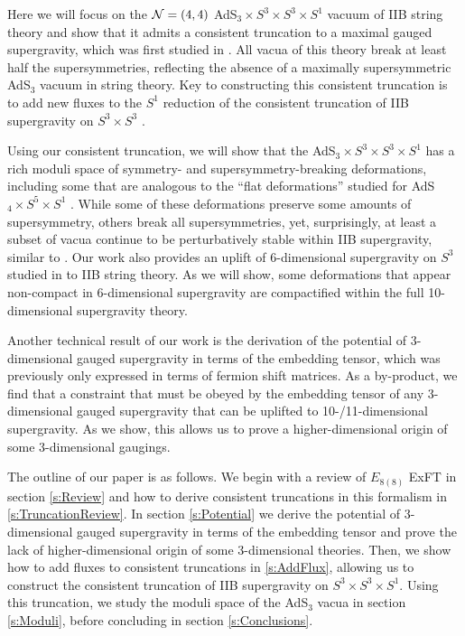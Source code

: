 \documentclass[a4paper, 11pt]{article}
\numberwithin{equation}{section}
\newcommand{\EE}{\ensuremath{E_{8(8)}}\xspace}
\newcommand{\+}{\oplus}
\begin{document}
Here we will focus on the ${\cal N}=(4,4)$ AdS$_3 \times S^3 \times S^3 \times S^1$ vacuum of IIB string theory and show that it admits a consistent truncation to a maximal gauged supergravity, which was first studied in \cite{Hohm:2005ui}. All vacua of this theory break at least half the supersymmetries, reflecting the absence of a maximally supersymmetric AdS$_3$ vacuum in string theory. Key to constructing this consistent truncation is to add new fluxes to the $S^1$ reduction of the consistent truncation of IIB supergravity on $S^3 \times S^3$ \cite{Inverso:2016eet}.

Using our consistent truncation, we will show that the AdS$_3 \times S^3 \times S^3 \times S^1$ has a rich moduli space of symmetry- and supersymmetry-breaking deformations, including some that are analogous to the ``flat deformations'' studied for AdS$_4 \times S^5 \times S^1$ \cite{Guarino:2020gfe,Guarino:2021hrc,Giambrone:2021zvp,Giambrone:2021wsm}. While some of these deformations preserve some amounts of supersymmetry, others break all supersymmetries, yet, surprisingly, at least a subset of vacua continue to be perturbatively stable within IIB supergravity, similar to \cite{Giambrone:2021wsm}. Our work also provides an uplift of 6-dimensional supergravity on $S^3$ studied in \cite{Eloy:2021fhc} to IIB string theory. As we will show, some deformations that appear non-compact in 6-dimensional supergravity \cite{Eloy:2021fhc} are compactified within the full 10-dimensional supergravity theory.

Another technical result of our work is the derivation of the potential of 3-dimensional gauged supergravity in terms of the embedding tensor, which was previously only expressed in terms of fermion shift matrices. As a by-product, we find that a constraint that must be obeyed by the embedding tensor of any 3-dimensional gauged supergravity that can be uplifted to 10-/11-dimensional supergravity. As we show, this allows us to prove a higher-dimensional origin of some 3-dimensional gaugings.

The outline of our paper is as follows. We begin with a review of $\EE$ ExFT in section \ref{s:Review} and how to derive consistent truncations in this formalism in \ref{s:TruncationReview}. In section \ref{s:Potential} we derive the potential of 3-dimensional gauged supergravity in terms of the embedding tensor and prove the lack of higher-dimensional origin of some 3-dimensional theories. Then, we show how to add fluxes to consistent truncations in \ref{s:AddFlux}, allowing us to construct the consistent truncation of IIB supergravity on $S^3 \times S^3 \times S^1$. Using this truncation, we study the moduli space of the AdS$_3$ vacua in section \ref{s:Moduli}, before concluding in section \ref{s:Conclusions}.
\end{document}
